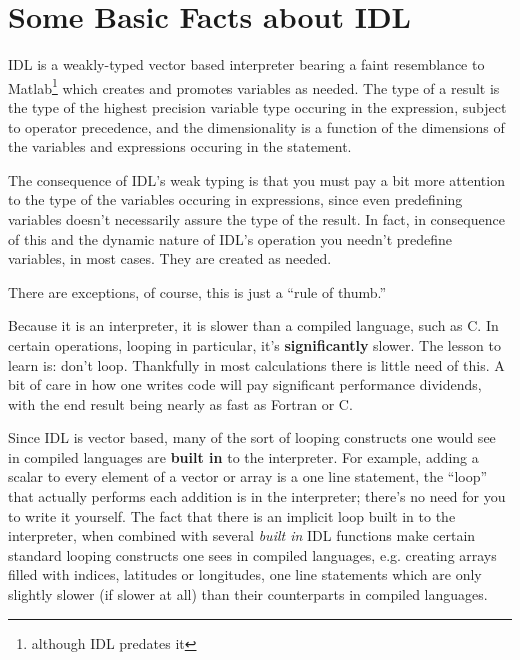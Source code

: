 
\section{Some Basic Facts about IDL}

  IDL is a weakly-typed vector based interpreter bearing a faint
  resemblance to Matlab\footnote{although IDL predates it} which creates
  and promotes variables as needed. The type of a result is the type of
  the highest precision variable type occuring in the expression,
  subject to operator precedence, and the dimensionality is a function
  of the dimensions of the variables and expressions occuring in the
  statement.

  The consequence of IDL's weak typing is that you must pay a bit more
  attention to the type of the variables occuring in expressions,
  since even predefining variables doesn't necessarily assure the type
  of the result. In fact, in consequence of this and the dynamic
  nature of IDL's operation you needn't predefine variables, in most
  cases. They are created as needed.

  There are exceptions, of course, this is just a ``rule of thumb.''

  Because it is an interpreter, it is slower than a compiled language,
  such as C. In certain operations, looping in particular, it's
  \textbf{significantly} slower. The lesson to learn is: don't
  loop. Thankfully in most calculations there is little need of
  this. A bit of care in how one writes code will pay significant
  performance dividends, with the end result being nearly as fast as
  Fortran or C.

  Since IDL is vector based, many of the sort of looping constructs
  one would see in compiled languages are \textbf{built in} to the
  interpreter. For example, adding a scalar to every element of a
  vector or array is a one line statement, the ``loop'' that actually
  performs each addition is in the interpreter; there's no need for
  you to write it yourself. The fact that there is an implicit loop
  built in to the interpreter, when combined with several
  \textit{built in} IDL functions make certain standard looping
  constructs one sees in compiled languages, e.g. creating arrays
  filled with indices, latitudes or longitudes,  one line statements
  which are only slightly slower (if slower at all) than their
  counterparts in compiled languages.

